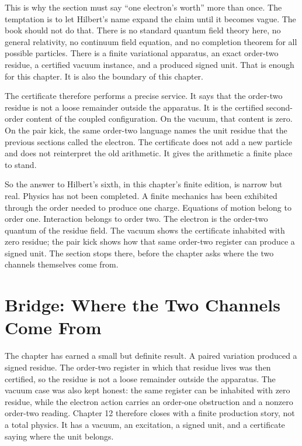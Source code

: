 This is why the section must say ``one electron's worth'' more than once. The
temptation is to let Hilbert's name expand the claim until it becomes vague.
The book should not do that. There is no standard quantum field theory here, no
general relativity, no continuum field equation, and no completion theorem for
all possible particles. There is a finite variational apparatus, an exact
order-two residue, a certified vacuum instance, and a produced signed unit.
That is enough for this chapter. It is also the boundary of this chapter.

The certificate therefore performs a precise service. It says that the order-two
residue is not a loose remainder outside the apparatus. It is the certified
second-order content of the coupled configuration. On the vacuum, that content
is zero. On the pair kick, the same order-two language names the unit residue
that the previous sections called the electron. The certificate does not add a
new particle and does not reinterpret the old arithmetic. It gives the
arithmetic a finite place to stand.

So the answer to Hilbert's sixth, in this chapter's finite edition, is narrow
but real. Physics has not been completed. A finite mechanics has been exhibited
through the order needed to produce one charge. Equations of motion belong to
order one. Interaction belongs to order two. The electron is the order-two
quantum of the residue field. The vacuum shows the certificate inhabited with
zero residue; the pair kick shows how that same order-two register can produce
a signed unit. The section stops there, before the chapter asks where the two
channels themselves come from.

\section*{Bridge: Where the Two Channels Come From}

The chapter has earned a small but definite result. A paired variation produced
a signed residue. The order-two register in which that residue lives was then
certified, so the residue is not a loose remainder outside the apparatus. The
vacuum case was also kept honest: the same register can be inhabited with zero
residue, while the electron action carries an order-one obstruction and a
nonzero order-two reading. Chapter 12 therefore closes with a finite production
story, not a total physics. It has a vacuum, an excitation, a signed unit, and a
certificate saying where the unit belongs.

